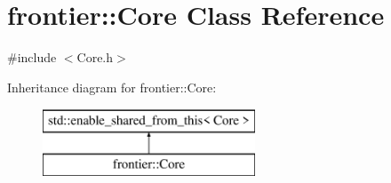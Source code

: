 \hypertarget{classfrontier_1_1_core}{}\section{frontier\+:\+:Core Class Reference}
\label{classfrontier_1_1_core}


{\ttfamily \#include $<$Core.\+h$>$}

Inheritance diagram for frontier\+:\+:Core\+:\begin{figure}[H]
\begin{center}
\leavevmode
\includegraphics[height=2.000000cm]{classfrontier_1_1_core}
\end{center}
\end{figure}
